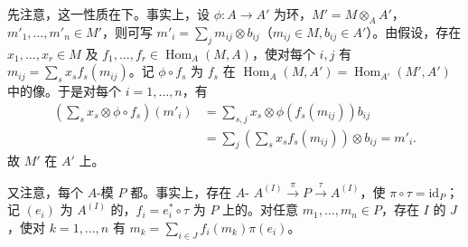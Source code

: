 先注意，这一性质在下。事实上，设 $\phi:A\to A'$ 为环，$M'=M\otimes_AA'$，$m'_1,\ldots,m'_n\in M'$，则可写 $m'_i=\sum_jm_{ij}\otimes b_{ij}$（$m_{ij}\in M,b_{ij}\in A'$）。由假设，存在 $x_1,\ldots,x_r\in M$ 及 $f_1,\ldots,f_r\in\operatorname{Hom}_A(M,A)$，使对每个 $i,j$ 有 $m_{ij}=\sum_sx_sf_s(m_{ij})$。记 $\phi\circ f_s$ 为 $f_s$ 在 $\operatorname{Hom}_A(M,A')=\operatorname{Hom}_{A'}(M',A')$ 中的像。于是对每个 $i=1,\ldots,n$，有
\[
\begin{aligned}
\left(\sum_sx_s\otimes\phi\circ f_s\right)(m'_i)
&=\sum_{s,j}x_s\otimes\phi(f_s(m_{ij}))b_{ij}\\
&=\sum_j\left(\sum_sx_sf_s(m_{ij})\right)\otimes b_{ij}=m'_i.
\end{aligned}
\]
故 $M'$ 在 $A'$ 上。

又注意，每个 $A$-模 $P$ 都。事实上，存在 $A$- $A^{(I)}\xrightarrow{\pi}P\xrightarrow{\tau}A^{(I)}$，使 $\pi\circ\tau=\mathrm{id}_P$；记 $(e_i)$ 为 $A^{(I)}$ 的，$f_i=e_i^*\circ\tau$ 为 $P$ 上的。对任意 $m_1,\ldots,m_n\in P$，存在 $I$ 的 $J$，使对 $k=1,\ldots,n$ 有 $m_k=\sum_{i\in J}f_i(m_k)\pi(e_i)$。

